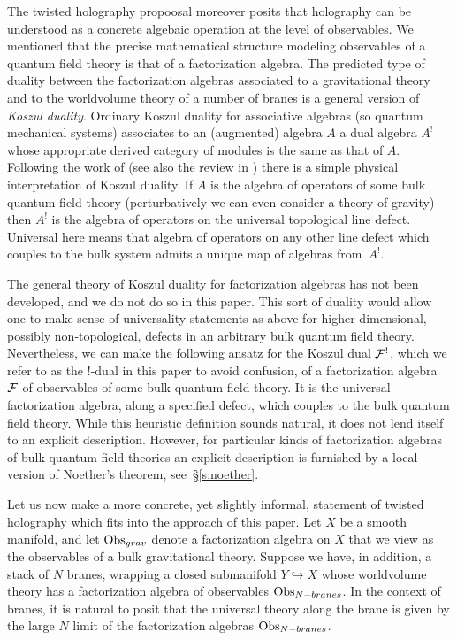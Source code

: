 The twisted holography propoosal moreover posits that holography can be understood as a concrete algebaic operation at the level of observables. We mentioned that the precise mathematical structure modeling observables of a quantum field theory is that of a factorization algebra. The predicted type of duality between the factorization algebras associated to a gravitational theory and to the worldvolume theory of a number of branes is a general version of \textit{Koszul duality}.
Ordinary Koszul duality for associative algebras (so quantum mechanical systems) associates to an (augmented) algebra $A$ a dual algebra $A^!$ whose appropriate derived category of modules is the same as that of $A$.
Following the work of \cite{CLsugra,CP1} (see also the review in \cite{PWkoszul}) there is a simple physical interpretation of Koszul duality.
If $A$ is the algebra of operators of some bulk quantum field theory (perturbatively we can even consider a theory of gravity) then $A^!$ is the algebra of operators on the universal topological line defect.
Universal here means that algebra of operators on any other line defect which couples to the bulk system admits a unique map of algebras from~$A^!$.

The general theory of Koszul duality for factorization algebras has not been developed, and we do not do so in this paper.
This sort of duality would allow one to make sense of universality statements as above for higher dimensional, possibly non-topological, defects in an arbitrary bulk quantum field theory.
Nevertheless, we can make the following ansatz for the Koszul dual $\mathcal F^!$, which we refer to as the $!$-dual in this paper to avoid confusion, of a factorization algebra~$\mathcal F$ of observables of some bulk quantum field theory.
It is the universal factorization algebra, along a specified defect, which couples to the bulk quantum field theory.
While this heuristic definition sounds natural, it does not lend itself to an explicit description.
However, for particular kinds of factorization algebras of bulk quantum field theories an explicit description is furnished by a local version of Noether's theorem, see~\S\ref{s:noether}.

Let us now make a more concrete, yet slightly informal, statement of twisted holography which fits into the approach of this paper.
Let $X$ be a smooth manifold, and let $\operatorname{Obs}_{grav}$ denote a factorization algebra on $X$ that we view as the observables of a bulk gravitational theory.
Suppose we have, in addition, a stack of $N$ branes, wrapping a closed submanifold $Y\hookrightarrow X$ whose worldvolume theory has a factorization algebra of observables $\operatorname{Obs}_{N-branes}$.
In the context of branes, it is natural to posit that the universal theory along the brane is given by the large $N$ limit of the factorization algebras $\operatorname{Obs}_{N-branes}$.

